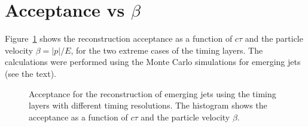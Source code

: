 \section{Acceptance vs $\beta$}
\label{appendix}

Figure~\ref{fig:efficiency_beta} shows the reconstruction
acceptance as a function of $c\tau$ and the  particle velocity  $\beta=|p|/E$, for the two extreme
cases of the timing layers.
The calculations were performed using the Monte Carlo simulations for emerging jets (see the text).

\begin{figure}
\begin{center}

\end{center}
\caption{
Acceptance for the reconstruction of emerging jets using the timing layers with different timing resolutions.
The histogram shows the acceptance as a function of $c\tau$ and the  particle velocity $\beta$. 
}
\label{fig:efficiency_beta}
\end{figure}

